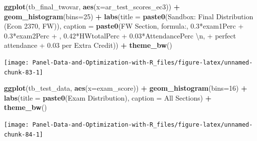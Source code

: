\documentclass[
]{book}
\newenvironment{Shaded}{\begin{snugshade}}{\end{snugshade}}
\newcommand{\CharTok}[1]{\textcolor[rgb]{0.31,0.60,0.02}{#1}}
\newcommand{\DataTypeTok}[1]{\textcolor[rgb]{0.13,0.29,0.53}{#1}}
\newcommand{\DecValTok}[1]{\textcolor[rgb]{0.00,0.00,0.81}{#1}}
\newcommand{\KeywordTok}[1]{\textcolor[rgb]{0.13,0.29,0.53}{\textbf{#1}}}
\newcommand{\NormalTok}[1]{#1}
\newcommand{\OperatorTok}[1]{\textcolor[rgb]{0.81,0.36,0.00}{\textbf{#1}}}
\newcommand{\StringTok}[1]{\textcolor[rgb]{0.31,0.60,0.02}{#1}}
\begin{document}
\begin{Shaded}
\begin{Highlighting}[]
\KeywordTok{ggplot}\NormalTok{(tb\_final\_twovar, }\KeywordTok{aes}\NormalTok{(}\DataTypeTok{x=}\NormalTok{ar\_test\_scores\_ec3)) }\OperatorTok{+}
\StringTok{  }\KeywordTok{geom\_histogram}\NormalTok{(}\DataTypeTok{bins=}\DecValTok{25}\NormalTok{) }\OperatorTok{+}
\StringTok{  }\KeywordTok{labs}\NormalTok{(}\DataTypeTok{title =} \KeywordTok{paste0}\NormalTok{(}\StringTok{\textquotesingle{}Sandbox: Final Distribution (Econ 2370, FW)\textquotesingle{}}\NormalTok{),}
       \DataTypeTok{caption =} \KeywordTok{paste0}\NormalTok{(}\StringTok{\textquotesingle{}FW Section, formula:\textquotesingle{}}\NormalTok{,}
                        \StringTok{\textquotesingle{}0.3*exam1Perc + 0.3*exam2Perc + \textquotesingle{}}\NormalTok{,}
                        \StringTok{\textquotesingle{}0.42*HWtotalPerc + 0.03*AttendancePerc }\CharTok{\textbackslash{}n}\StringTok{\textquotesingle{}}\NormalTok{,}
                        \StringTok{\textquotesingle{}+ perfect attendance + 0.03 per Extra Credit\textquotesingle{}}\NormalTok{)) }\OperatorTok{+}
\StringTok{  }\KeywordTok{theme\_bw}\NormalTok{()}
\end{Highlighting}
\end{Shaded}

\begin{center}\texttt{[image: Panel-Data-and-Optimization-with-R\_files/figure-latex/unnamed-chunk-83-1]} \end{center}

\begin{Shaded}
\begin{Highlighting}[]
\KeywordTok{ggplot}\NormalTok{(tb\_test\_data, }\KeywordTok{aes}\NormalTok{(}\DataTypeTok{x=}\NormalTok{exam\_score)) }\OperatorTok{+}
\StringTok{  }\KeywordTok{geom\_histogram}\NormalTok{(}\DataTypeTok{bins=}\DecValTok{16}\NormalTok{) }\OperatorTok{+}
\StringTok{  }\KeywordTok{labs}\NormalTok{(}\DataTypeTok{title =} \KeywordTok{paste0}\NormalTok{(}\StringTok{\textquotesingle{}Exam Distribution\textquotesingle{}}\NormalTok{),}
       \DataTypeTok{caption =} \StringTok{\textquotesingle{}All Sections\textquotesingle{}}\NormalTok{) }\OperatorTok{+}
\StringTok{  }\KeywordTok{theme\_bw}\NormalTok{()}
\end{Highlighting}
\end{Shaded}

\begin{center}\texttt{[image: Panel-Data-and-Optimization-with-R\_files/figure-latex/unnamed-chunk-84-1]} \end{center}
\end{document}
